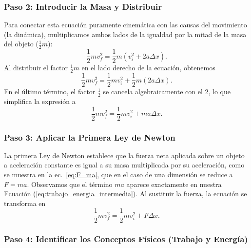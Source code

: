 \documentclass[11pt,a4paper]{book}
\begin{document}
\subsubsection{Paso 2: Introducir la Masa y Distribuir}

Para conectar esta ecuación puramente cinemática con las causas del movimiento (la dinámica), multiplicamos ambos lados de la igualdad por la mitad de la masa del objeto ($\frac{1}{2}m$):
\begin{equation}
    \frac{1}{2}m v_f^2 = \frac{1}{2}m \left( v_i^2 + 2a\Delta x \right).
\end{equation}
Al distribuir el factor $\frac{1}{2}m$ en el lado derecho de la ecuación, obtenemos
\begin{equation}
    \frac{1}{2}m v_f^2 = \frac{1}{2}m v_i^2 + \frac{1}{2}m (2a\Delta x).
\end{equation}
En el último término, el factor $\frac{1}{2}$ se cancela algebraicamente con el $2$, lo que simplifica la expresión a
\begin{equation}
    \frac{1}{2}m v_f^2 = \frac{1}{2}m v_i^2 + m a \Delta x.
    \label{eq:trabajo_energia_intermedia}
\end{equation}

\subsubsection{Paso 3: Aplicar la Primera Ley de Newton}

La primera Ley de Newton establece que la fuerza neta aplicada sobre un objeto a aceleración constante es igual a su masa multiplicada por su aceleración, como se muestra en la ec.~\eqref{eq:F=ma}, que en el caso de una dimensión se reduce a $F = ma$. Observamos que el término $ma$ aparece exactamente en nuestra Ecuación (\ref{eq:trabajo_energia_intermedia}). Al sustituir la fuerza, la ecuación se transforma en
\begin{equation}
    \frac{1}{2}m v_f^2 = \frac{1}{2}m v_i^2 + F \Delta x.
\end{equation}

\subsubsection{Paso 4: Identificar los Conceptos Físicos (Trabajo y Energía)}
\end{document}
